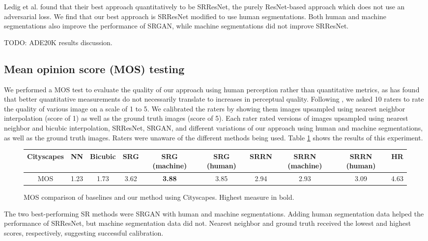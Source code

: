 \documentclass[10pt,twocolumn,letterpaper]{article}
\begin{document}
Ledig et al. \cite{SRGAN} found that their best approach quantitatively to be
SRResNet, the purely ResNet-based approach which does not use an adversarial
loss. We find that our best approach is SRResNet modified to use human
segmentations. Both human and machine segmentations also improve the
performance of SRGAN, while machine segmentations did not improve SRResNet.

TODO: ADE20K results discussion.

\subsection{Mean opinion score (MOS) testing}
We performed a MOS test to evaluate the quality of our approach using human
perception rather than quantitative metrics, as \cite{SRGAN} has found that
better quantitative measurements do not necessarily translate to increases in
perceptual quality. Following \cite{SRGAN}, we asked 10 raters to rate the
quality of various image on a scale of 1 to 5. We calibrated the raters by
showing them images upsampled using nearest neighbor interpolation (score of 1)
as well as the ground truth images (score of 5). Each rater rated versions of
images upsampled using nearest neighbor and bicubic interpolation, SRResNet,
SRGAN, and different variations of our approach using human and machine
segmentations, as well as the ground truth images. Raters were unaware of the
different methods being used. Table \ref{fig:mos} shows the results of this
experiment.

\begin{figure}[ht!]
    \begin{centering}
        \small
        \begin{tabular}{c ccccccccc}
            \textbf{Cityscapes} & NN & Bicubic & SRG & SRG (machine) & SRG
            (human) & SRRN & SRRN (machine) & SRRN (human) & HR \\
            \hline
            MOS & 1.23 & 1.73 & 3.62 & \textbf{3.88} & 3.85 & 2.94 & 2.93 & 3.09 & 4.63
        \end{tabular}
    \end{centering}
    \caption{MOS comparison of baselines and our method using Cityscapes. Highest
    measure in bold.}
    \label{fig:mos}
\end{figure}

The two best-performing SR methods were SRGAN with human and machine
segmentations. Adding human segmentation data helped the performance of
SRResNet, but machine segmentation data did not. Nearest neighbor and ground
truth received the lowest and highest scores, respectively, suggesting
successful calibration.
\end{document}

